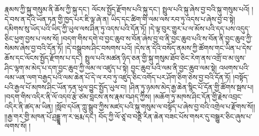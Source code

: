 རྣམས་ཀྱི་སྐུ་གསུམ་ནི་ཆོས་ཀྱི་སྐུ་དང་། ལོངས་སྤྱོད་རྫོགས་པའི་སྐུ་དང་། སྤྲུལ་པའི་སྐུ་ཞེས་བྱ་བའི་སྐུ་གསུམ་པའོ། །དེ་བས་ན་དེའི་ཡོན་ཏན་གྱི་ཁྱད་པར་ཇི་ལྟ་ཞེ་ན། ཡིད་དང་ཚིག་གི་ལམ་ལས་རབ་ཏུ་འདས་པ་ཞེས་བྱ་བ་སྟེ། དམིགས་སུ་ཡོད་པའི་ཡིད་ཀྱི་ཡུལ་ལས་ཤིན་ཏུ་འདས་པའི་དོན་ཏོ། །དེ་ལྟ་བུར་གྱུར་པ་ལ་མོས་པའི་དད་པས་འདུད་ཅིང་ཕྱག་བྱས་པ་ལས་སོ། །བདག་གིས་དགེ་བ་བྱང་ཆུབ་ས་བོན་ཞེས་བྱ་བ་ནི་བྱང་ཆུབ་པའི་ས་བོན་ནི་བྱང་ཆུབ་ཀྱི་སེམས་ཞེས་བྱ་བའི་དོན་ཏོ། །དེ་བསྒྲུབས་ཤིང་བསགས་པའོ། །དེས་ན་དེའི་བསོད་ནམས་ཀྱི་ཚོགས་གང་ཡིན་པ་དེས་ཆོས་དང་ལོངས་སྤྱོད་རྫོགས་པ་དང་། སྤྲུལ་པའི་མཚན་ཉིད་ཅན་གྱི་སྐུ་གསུམ་ཐོབ་ཅིང་རེག་ནས་འགྲོ་བ་མ་ལུས་ཤིང་ལྷག་མ་མེད་པ་དག་བྱང་ཆུབ་ཀྱི་ལམ་ལ་འཛུད་པ་སྟེ། བྱང་ཆུབ་པའི་ལམ་ནི་བྱང་ཆུབ་ལམ་སྟེ། འཕགས་པའི་ལམ་ཡན་ལག་བརྒྱད་པའི་ལམ་ཆེན་པོ་དེ་ལ་རབ་ཏུ་འཛུད་ཅིང་འགོད་པར་ཤོག་ཅིག་ཅེས་བྱ་བའི་དོན་ཏོ། །བསྟོད་པའི་རྒྱལ་པོ་མཁས་ཤིང་ཡོན་ཏན་ཕུལ་བྱུང་སྤྱོད་ཡུལ་བ། །ཤིན་ཏུ་ཉམས་མེད་རྒྱ་ཆེན་སྙིང་པོ་དོན་གྱི་ཚོགས་སྦས་པ། །བདག་གིས་འདིར་ནི་ལོ་འདབ་རྩེ་ཙམ་བླངས་ནས་རྣམ་བཤད་ཀྱིས། །མཆོག་ཏུ་མཁས་ཤིང་དོན་གྱི་རྗེས་འབྲང་འདིར་ནི་ཚད་མ་ཡིན། །སློབ་དཔོན་ཀླུ་སྒྲུབ་ཀྱིས་མཛད་པའི་སྐུ་གསུམ་ལ་བསྟོད་པ་ཞེས་བྱ་བའི་འགྲེལ་པ་རྫོགས་སོ།། །།རྒྱ་གར་གྱི་མཁན་པོ་ཤྲདྡྷཱ་ཀ་ར་ཝརྨ་དང་། བོད་ཀྱི་ལོ་ཙཱ་བ་བནྡེ་རིན་ཆེན་བཟང་པོས་གསར་དུ་བསྒྱུར་ཅིང་ཞུས་པ་ལགས་སོ། ། 